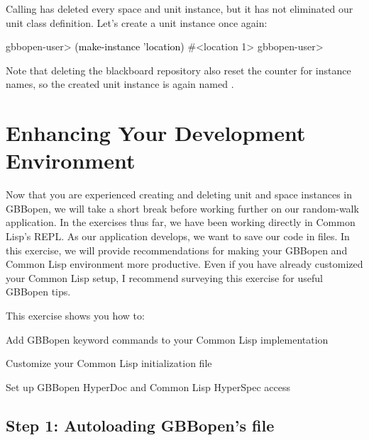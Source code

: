 \documentclass[10pt,twoside,english,pdftex]{article}
\begin{document}
%
Calling  has deleted every space
and unit instance, but it has not eliminated our  unit
class definition.  Let's create a  unit instance once
again:
%
\W\supp
\begin{example}
\textcolor{darkergray}{%
  gbbopen-user> \textcolor{black}{(make-instance 'location)}
  #<location 1>
  gbbopen-user>}
\end{example}
%
Note that deleting the blackboard repository also reset the counter for
 instance names, so the created unit instance is again
named .


\T\markright{}%
\T\pagestyle{plain}
\T\cleardoublepage
\W{}
\T\pagestyle{fancy}
\T\thispagestyle{fancybottom}
\T\renewcommand{\headrulewidth}{0pt}
\section{Enhancing Your Development Environment}
\label{sec:environment}%

Now that you are experienced creating and deleting unit and space instances in
GBBopen, we will take a short break before working further on our random-walk
application.  In the exercises thus far, we have been working directly in
Common Lisp's REPL.  As our application develops, we want to save our code in
files. In this exercise, we will provide recommendations for making your
GBBopen and Common Lisp environment more productive.  Even if you have already
customized your Common Lisp setup, I recommend surveying this exercise for
useful GBBopen tips.

\fndocrule

This exercise shows you how to:
\begin{tightitemize}
\item Add GBBopen keyword commands to your Common Lisp implementation
\item Customize your Common Lisp initialization file
\item Set up GBBopen HyperDoc and Common Lisp HyperSpec access
\end{tightitemize}

\fndocrule

\subsection*{Step 1: Autoloading GBBopen's  file}
\end{document}
